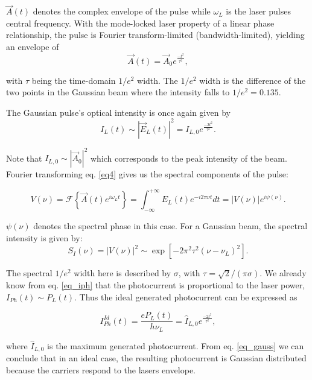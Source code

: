 $\vec{A}(t)$ denotes the complex envelope of the pulse while $\omega_L$ is the laser pulses central frequency. With the mode-locked laser property of a linear phase relationship, the pulse is Fourier transform-limited (bandwidth-limited), yielding an envelope of
\begin{equation}
	\vec{A}(t) = \vec{A}_0 e^{\frac{-t^2}{\tau^2}},
\end{equation}

with $\tau$ being the time-domain $1/e^2$ width. The  $1/e^2$ width is the difference of the two points in the Gaussian beam where the intensity falls to $1/e^2 = 0.135$. 

The Gaussian pulse's optical intensity is once again given by
\begin{equation}
	I_L(t) \sim |\vec{E}_L(t)|^2 = I_{L,0}e^{\frac{-2t^2}{\tau ^2}}.
\end{equation} 

Note that $I_{L,0} \sim |\vec{A}_0|^2$ which corresponds to the peak intensity of the beam. 
Fourier transforming eq. \eqref{eq4} gives us the spectral components of the pulse:

\begin{equation}
	V(\nu) =  \mathcal{F}\left\{\vec{A}(t)e^{i\omega_Lt} \right\}
	= \int_{-\infty}^{+\infty}E_L(t)e^{-i2\pi\nu t}dt = |V(\nu)|e^{i\psi(\nu)}.
\end{equation}

$\psi(\nu)$ denotes the spectral phase in this case. For a Gaussian beam, the spectral intensity is given by:
\begin{equation}
	S_I(\nu) = |V(\nu)|^2 \sim \exp[-2\pi^2\tau^2(\nu - \nu_L)^2]. 
\end{equation}

The spectral $1/e^2$ width here is described by $\sigma$, with $\tau = \sqrt{2}/(\pi \sigma)$. We already know from eq. \eqref{eq_iph} that the photocurrent is proportional to the laser power, $I_{Ph}(t) \sim P_L(t)$. Thus the ideal generated photocurrent can be expressed as 

\begin{equation}
	I_{Ph}^{Id}(t) = \frac{eP_L(t)}{h\nu_L} = \hat{I}_{L,0} e^{\frac{-2t^2}{\tau^2}},
\label{eq_gauss}
\end{equation}

where $\hat{I}_{L,0}$ is the maximum generated photocurrent. From eq. \eqref{eq_gauss} we can conclude that in an ideal case, the resulting photocurrent is Gaussian distributed because the carriers respond to the lasers envelope. 

